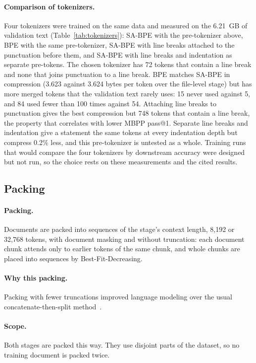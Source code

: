 \documentclass[sigconf,nonacm,balance=false]{acmart}
\begin{document}
\paragraph{Comparison of tokenizers.} Four tokenizers were trained on the same data and measured on the 6.21~GB of
validation text (Table~\ref{tab:tokenizers}): SA-BPE with the pre-tokenizer above, BPE with the same pre-tokenizer,
SA-BPE with line breaks attached to the punctuation before them, and SA-BPE with line breaks and indentation as
separate pre-tokens. The chosen tokenizer has 72 tokens that contain a line break and none that joins punctuation to a
line break. BPE matches SA-BPE in compression (3.623 against 3.624 bytes per token over the file-level stage) but has
more merged tokens that the validation text rarely uses: 15 never used against 5, and 84 used fewer than 100 times
against 54. Attaching line breaks to punctuation gives the best compression but 748 tokens that contain a line break,
the property that correlates with lower MBPP pass@1. Separate line breaks and indentation give a statement the same
tokens at every indentation depth but compress 0.2\% less, and this pre-tokenizer is untested as a whole. Training runs
that would compare the four tokenizers by downstream accuracy were designed but not run, so the choice rests on these
measurements and the cited results.

\subsection{Packing}
\label{sec:packing}

\paragraph{Packing.} Documents are packed into sequences of the stage's context length, 8,192 or 32,768 tokens, with
document masking and without truncation: each document chunk attends only to earlier tokens of the same chunk, and
whole chunks are placed into sequences by Best-Fit-Decreasing.

\paragraph{Why this packing.} Packing with fewer truncations improved language modeling over the usual
concatenate-then-split method~\cite{ding2024fewer}.

\paragraph{Scope.} Both stages are packed this way. They use disjoint parts of the dataset, so no training document
is packed twice.
\end{document}
